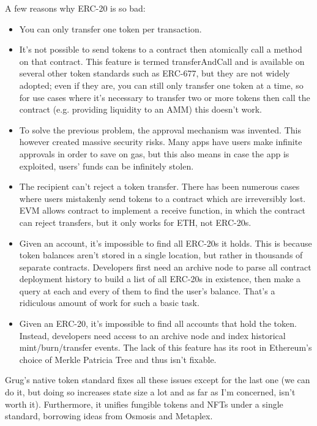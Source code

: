 \documentclass{article}
\begin{document}
A few reasons why ERC-20 is so bad:

\begin{itemize}
  \item You can only transfer one token per transaction.
  \item It's not possible to send tokens to a contract then atomically call a method on that contract. This feature is termed transferAndCall and is available on several other token standards such as ERC-677, but they are not widely adopted; even if they are, you can still only transfer one token at a time, so for use cases where it's necessary to transfer two or more tokens then call the contract (e.g. providing liquidity to an AMM) this doesn't work.
  \item To solve the previous problem, the approval mechanism was invented. This however created massive security risks. Many apps have users make infinite approvals in order to save on gas, but this also means in case the app is exploited, users' funds can be infinitely stolen.
  \item The recipient can't reject a token transfer. There has been numerous cases where users mistakenly send tokens to a contract which are irreversibly lost. EVM allows contract to implement a receive function, in which the contract can reject transfers, but it only works for ETH, not ERC-20s.
  \item Given an account, it's impossible to find all ERC-20s it holds. This is because token balances aren't stored in a single location, but rather in thousands of separate contracts. Developers first need an archive node to parse all contract deployment history to build a list of all ERC-20s in existence, then make a query at each and every of them to find the user's balance. That's a ridiculous amount of work for such a basic task.
  \item Given an ERC-20, it's impossible to find all accounts that hold the token. Instead, developers need access to an archive node and index historical mint/burn/transfer events. The lack of this feature has its root in Ethereum's choice of Merkle Patricia Tree and thus isn't fixable.
\end{itemize}
Grug's native token standard fixes all these issues except for the last one (we can do it, but doing so increases state size a lot and as far as I'm concerned, isn't worth it). Furthermore, it unifies fungible tokens and NFTs under a single standard, borrowing ideas from Osmosis\supercite{tokenfactory} and Metaplex.\supercite{metaplex}
\end{document}
